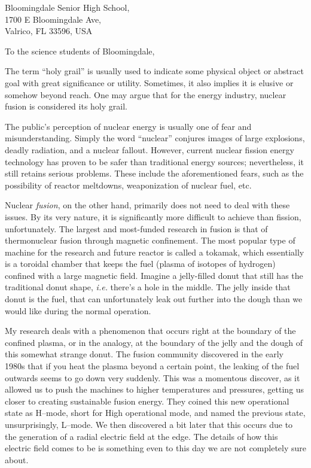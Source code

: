 \documentclass[12pt,a4paper]{letter}
\date{\today}
\begin{document}
\begin{letter}{
	Bloomingdale Senior High School,\\
	1700 E Bloomingdale Ave,\\
	Valrico, FL 33596, USA
}

\opening{To the science students of Bloomingdale,}

The term ``holy grail'' is usually used to indicate some physical object or abstract goal with great significance or utility.
Sometimes, it also implies it is elusive or somehow beyond reach.
One may argue that for the energy industry, nuclear fusion is considered its holy grail.

The public's perception of nuclear energy is usually one of fear and misunderstanding.
Simply the word ``nuclear'' conjures images of large explosions, deadly radiation, and a nuclear fallout.
However, current nuclear fission energy technology has proven to be safer than traditional energy sources; nevertheless, it still retains serious problems.
These include the aforementioned fears, such as the possibility of reactor meltdowns, weaponization of nuclear fuel, etc. 

Nuclear \emph{fusion}, on the other hand, primarily does not need to deal with these issues.
By its very nature, it is significantly more difficult to achieve than fission, unfortunately.
The largest and most-funded research in fusion is that of thermonuclear fusion through magnetic confinement.
The most popular type of machine for the research and future reactor is called a tokamak, which essentially is a toroidal chamber that keeps the fuel (plasma of isotopes of hydrogen) confined with a large magnetic field.
Imagine a jelly-filled donut that still has the traditional donut shape, \emph{i.e.} there's a hole in the middle.
The jelly inside that donut is the fuel, that can unfortunately leak out further into the dough than we would like during the normal operation.

My research deals with a phenomenon that occurs right at the boundary of the confined plasma, or in the analogy, at the boundary of the jelly and the dough of this somewhat strange donut.
The fusion community discovered in the early 1980s that if you heat the plasma beyond a certain point, the leaking of the fuel outwards seems to go down very suddenly.
This was a momentous discover, as it allowed us to push the machines to higher temperatures and pressures, getting us closer to creating sustainable fusion energy.
They coined this new operational state as H--mode, short for High operational mode, and named the previous state, unsurprisingly, L--mode.
We then discovered a bit later that this occurs due to the generation of a radial electric field at the edge.
The details of how this electric field comes to be is something even to this day we are not completely sure about.


\end{letter}
\end{document}
